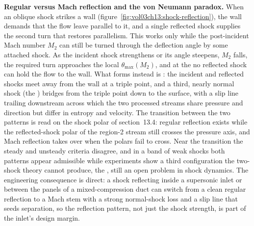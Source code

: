 \begin{mastery}
\textbf{Regular versus Mach reflection and the von Neumann paradox.} When
an oblique shock strikes a wall (figure~\ref{fig:vol03ch13:shock-reflection}),
the wall demands that the flow leave parallel to it, and a single
reflected shock supplies the second turn that restores parallelism. This
 works only while the post-incident Mach
number $M_2$ can still be turned through the deflection angle by some
attached shock. As the incident shock strengthens or its angle steepens,
$M_2$ falls, the required turn approaches the local $\theta_{\max}(M_2)$,
and at the  no reflected shock can hold the
flow to the wall. What forms instead is : the
incident and reflected shocks meet away from the wall at a triple point,
and a third, nearly normal shock (the ) bridges from
the triple point down to the surface, with a slip line trailing
downstream across which the two processed streams share pressure and
direction but differ in entropy and velocity. The transition between the
two patterns is read on the shock polar of section~13.4: regular
reflection exists while the reflected-shock polar of the region-2 stream
still crosses the pressure axis, and Mach reflection takes over when the
polars fail to cross. Near the transition the steady and unsteady
criteria disagree, and in a band of weak shocks both patterns appear
admissible while experiments show a third configuration the two-shock
theory cannot produce, the , still an open
problem in shock dynamics. The engineering consequence is direct: a
shock reflecting inside a supersonic inlet or between the panels of a
mixed-compression duct can switch from a clean regular reflection to a
Mach stem with a strong normal-shock loss and a slip line that seeds
separation, so the reflection pattern, not just the shock strength, is
part of the inlet's design margin.
\end{mastery}

